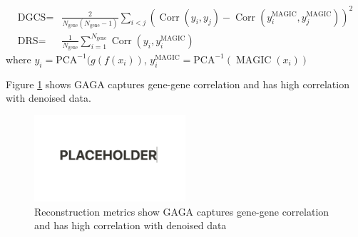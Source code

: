 \documentclass{article}
\theoremstyle{plain}
\theoremstyle{definition}
\theoremstyle{remark}
\newcommand{\methodshort}{GAGA\xspace}
\begin{document}
\begin{align}
    \text{DGCS}=&\frac{2}{N_{\text{gene}}(N_{\text{gene}}-1)}\sum_{i<j}(\operatorname{Corr}(y_i,y_j)-\operatorname{Corr}(y^{\text{MAGIC}}_i,y^{\text{MAGIC}}_j))^2\\
    \text{DRS}=&\frac{1}{N_{\text{gene}}}\sum_{i=1}^{N_{\text{gene}}}\operatorname{Corr}(y_i,y^{\text{MAGIC}}_i)
\end{align}
where $y_i=\operatorname{PCA^{-1}}(g(f(x_i))$, $y^{\text{MAGIC}}_i=\operatorname{PCA^{-1}}(\operatorname{MAGIC}(x_i))$
\par Figure \ref{fig:recon_score} shows \methodshort captures gene-gene correlation and has high correlation with denoised data.
\begin{figure}[htbp]
    \centering
    \includegraphics[width=0.5\textwidth]{fig/PLACEHOLDER.png}
    \caption{Reconstruction metrics show \methodshort captures gene-gene correlation and has high correlation with denoised data}
    \label{fig:recon_score}
\end{figure}
\end{document}
